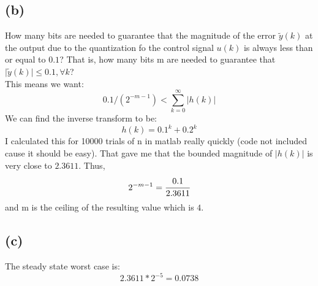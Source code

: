\documentclass{article}
\begin{document}
\subsection*{(b)}
How many bits are needed to guarantee that the magnitude of the error $\tilde{y}(k)$ at the output due to the quantization fo the control signal $u(k)$ is always less than or equal to $0.1$? That is, how many bits m are needed to guarantee that $\lvert \tilde{y}(k)\rvert\leq 0.1, \forall k$?\\
This means we want:
\[0.1/(2^{-m-1})< \sum_{k=0}^\infty \lvert h(k)\rvert\]
We can find the inverse transform to be:
\[h(k)=0.1^k+0.2^k\]
I calculated this for 10000 trials of n in matlab really quickly (code not included cause it should be easy). That gave me that the bounded magnitude of $\lvert h(k)\rvert$ is very close to $2.3611$. Thus,
\[2^{-m-1}=\cfrac{0.1}{2.3611}\]
and m is the ceiling of the resulting value which is $4$.
\subsection*{(c)}
The steady state worst case is:
\[2.3611*2^{-5}=0.0738\]
\end{document}
